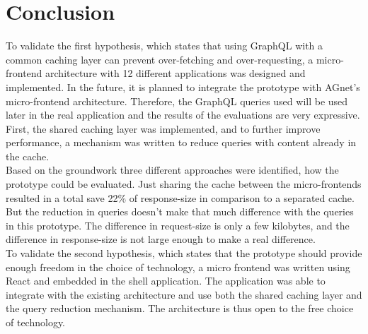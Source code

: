 \chapter{Conclusion}\label{chapter:conclusion}

To validate the first hypothesis, which states that using GraphQL with a common caching layer can prevent over-fetching and over-requesting, a micro-frontend architecture with 12 different applications was designed and implemented. In the future, it is planned to integrate the prototype with AGnet's micro-frontend architecture. Therefore, the GraphQL queries used will be used later in the real application and the results of the evaluations are very expressive.\\

First, the shared caching layer was implemented, and to further improve performance, a mechanism was written to reduce queries with content already in the cache.\\

Based on the groundwork three different approaches were identified, how the prototype could be evaluated. Just sharing the cache between the micro-frontends resulted in a total save 22\% of response-size in comparison to a separated cache.\\

But the reduction in queries doesn't make that much difference with the queries in this prototype. The difference in request-size is only a few kilobytes, and the difference in response-size is not large enough to make a real difference.\\

To validate the second hypothesis, which states that the prototype should provide enough freedom in the choice of technology, a micro frontend was written using React and embedded in the shell application. The application was able to integrate with the existing architecture and use both the shared caching layer and the query reduction mechanism. The architecture is thus open to the free choice of technology.\\

%
%
\clearpage
\printbibliography
\clearpage

\listoffigures
\clearpage

\listoftables
\clearpage

\listoflistings
\clearpage

{}